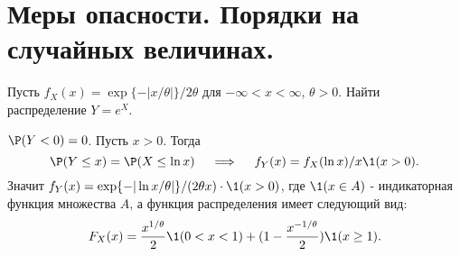 \chapter{Меры опасности. Порядки на случайных величинах.}
    \problem{}
        Пусть $f_X(x) = \exp\{ - |x/\theta | \}/2\theta$ для $-\infty < x < \infty$, $\theta>0$. Найти распределение $Y=e^X$.

        \solution{}
            $\P(Y < 0) = 0$. Пусть $x>0$. Тогда 
            \begin{equation*}
                \P (Y \leq x) =  \P ( X \leq \ln x) \quad \implies \quad f_Y(x) = f_X(\ln x)/x \1(x>0). 
            \end{equation*}
            Значит $f_Y(x) = \exp \{-|\ln x /\theta |  \}/( 2\theta x) \cdot \1(x>0)$, где  $\1(x \in A)$ - индикаторная функция множества $A$, а функция распределения имеет следующий вид:
            \begin{equation*}
                F_X(x) = \frac{x^{1/\theta}}{2}  \1(0<x<1) + (1 - \frac{x^{-1/\theta}}{2}) \1(x\geq 1).
            \end{equation*}
    
